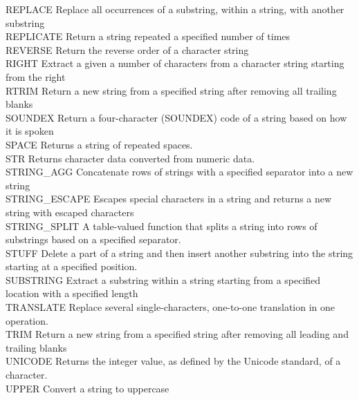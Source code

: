 \documentclass[13pt,oneside]{book}
\begin{document}
REPLACE	Replace all occurrences of a substring, within a string, with another substring\\
REPLICATE	Return a string repeated a specified number of times\\
REVERSE	Return the reverse order of a character string\\
RIGHT	Extract a given a number of characters from a character string starting from the right\\
RTRIM	Return a new string from a specified string after removing all trailing blanks\\
SOUNDEX	Return a four-character (SOUNDEX) code of a string based on how it is spoken\\
SPACE	Returns a string of repeated spaces.\\
STR	Returns character data converted from numeric data.\\
STRING\_AGG	Concatenate rows of strings with a specified separator into a new string\\
STRING\_ESCAPE	Escapes special characters in a string and returns a new string with escaped characters\\
STRING\_SPLIT	A table-valued function that splits a string into rows of substrings based on a specified separator.\\
STUFF	Delete a part of a string and then insert another substring into the string starting at a specified position.\\
SUBSTRING	Extract a substring within a string starting from a specified location with a specified length\\
TRANSLATE	Replace several single-characters, one-to-one translation in one operation.\\
TRIM	Return a new string from a specified string after removing all leading and trailing blanks\\
UNICODE	Returns the integer value, as defined by the Unicode standard, of a character.\\
UPPER	Convert a string to uppercase
\end{document}
